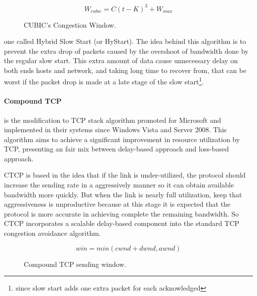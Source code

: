 \begin{figure}[ht]
\begin{minipage}{6cm}
\centering
	\[ W_{cubic} = C(t - K)^3 + W_{max}\]
    \caption{CUBIC's Congestion Window.\protect\footnotemark}
    \label{fig:cubicform}
\end{minipage}%
\end{figure}%


\noindent  one called Hybrid Slow Start (or HyStart)\cite{HaElephants}. 
The idea behind this algorithm is to prevent the extra drop of packets caused by the
overshoot of bandwidth done by the regular slow start. This extra amount of
data cause unnecessary delay on both ends hosts and network, and taking long time to
recover from, that can be worst if the packet drop is made at a late stage of
the slow start\footnote{since slow start adds one extra packet for each
acknowledged}.

\paragraph{Compound TCP} is the modification to TCP stack algorithm promoted
for Microsoft and implemented in their systems since Windows Vista and Server
2008. This algorithm aims to achieve a significant improvement in resource
utilization by TCP, presenting an fair mix between delay-based approach and
loss-based approach.

CTCP is based in the idea that if the link is under-utilized, the protocol
should increase the sending rate in a aggressively manner so it can obtain
available bandwidth more quickly. But when the link is nearly full
utilization, keep that aggressiveness is unproductive because at this stage it
is expected that the protocol is more accurate in achieving complete the
remaining bandwidth. So CTCP incorporates a scalable delay-based component
into the standard TCP congestion avoidance algorithm\cite{4146841}.

\begin{figure}
  \begin{center}
    \[ win = min(cwnd + dwnd, awnd)\]
  \end{center}
  \caption{Compound TCP sending window.\protect\footnotemark}
  \label{fig:ctcpform}
\end{figure}

